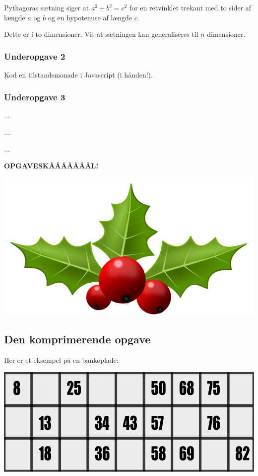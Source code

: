 Pythagoras sætning siger at $a^2 + b^2 = c^2$ for en retvinklet trekant med to
sider af længde $a$ og $b$ og en hypotenuse af længde $c$.

Dette er i to dimensioner.  Vis at sætningen kan generaliseres til $n$
dimensioner.


\subsubsection{Underopgave 2}

Kod en tilstandsmonade i Javascript (i hånden!).


\subsubsection{Underopgave 3}

$\ldots$

$\ldots$

$\ldots$

\textbf{OPGAVESKÅÅÅÅÅÅÅL!}

\begin{center}
\includegraphics[width=.8\textwidth]{holly-berries-remix.png}
\end{center}


\newpage

\subsection{Den komprimerende opgave}

Her er et eksempel på en bankoplade:

\begin{center}
\includegraphics[width=.99\textwidth]{bankoplade.pdf}
\end{center}

